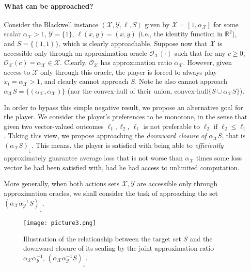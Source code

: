 \documentclass[a4paper,12pt]{article}
\newcommand{\mY}{\mathcal{Y}}
\newcommand{\mX}{\mathcal{X}}
\newcommand{\reals}{\mathbb{R}}
\newcommand{\oraclex}{\mathcal{O}_{\mX}}
\begin{document}
\paragraph*{What can be approached?}
Consider the Blackwell instance  $(\mX,\mY,\ell,S)$ given by $\mX = [1,\alpha_{\mX}]$ for some scalar $\alpha_{\mX} > 1$, $\mY=\{1\}$,  $\ell(x,y) = (x,y)$ (i.e., the identity function in $\reals^2$), and $S = \{(1,1)\}$, which is clearly approachable. Suppose now that $\mX$ is accessible only through an approximation oracle $\oraclex(\cdot)$ such that for any $c \geq 0$, $\oraclex(c) = \alpha_{\mX}\in\mX$. Clearly, $\oraclex$ has approximation ratio $\alpha_{\mX}$. However, given access to $\mX$ only through this oracle, the player  is forced to always play $x_t=\alpha_{\mX} > 1$, and clearly cannot approach $S$. Note  he also cannot approach $\alpha_{\mX}S = \{(\alpha_{\mX},\alpha_{\mX})\}$ (nor the convex-hull of their union, $\text{convex-hull}\{S\cup\alpha_{\mX}S\}$).


In order to bypass this simple negative result, we propose an alternative goal for the player. We consider the player's preferences to be monotone, in the sense that given two vector-valued outcomes $\ell_1,\ell_2$, $\ell_1$ is not preferable to $\ell_2$ if $\ell_2 \leq \ell_1$. Taking this view,  we propose approaching the \textit{downward closure of $\alpha_{\mX}S$}, that is $\left({\alpha_{\mX}S}\right)_{\downarrow}$. This means, the player is satisfied with being able to \textit{efficiently} approximately guarantee average loss that is not worse than $\alpha_{\mX}$ times some loss vector he had been satisfied with, had he had access to unlimited computation.

More generally, when both actions sets $\mX,\mY$ are accessible only through approximation oracles, we shall consider the task of approaching the set  $\left({\alpha_{\mX}\alpha_{\mY}^{-1}S}\right)_{\downarrow}$.
\begin{figure}[H]
\centering
\texttt{[image: picture3.png]}
\caption{Illustration of the relationship between the target set $S$ and the downward closure of its scaling by the joint approximation ratio $\alpha_{\mX}\alpha_{\mY}^{-1}$, $(\alpha_{\mX}\alpha_{\mY}^{-1}S)_{\downarrow}$.}
\end{figure}
\end{document}
